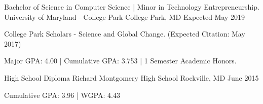

\begin{cventries}

  \cventry
    {Bachelor of Science in Computer Science  |  Minor in Technology Entrepreneurship.} %
    {University of Maryland - College Park} %
    {College Park, MD} %
    {Expected May 2019} %
    {
      \begin{cvitems} %
          \item {College Park Scholars - Science and Global Change. (Expected Citation: May 2017)}
          \item {Major GPA: 4.00 | Cumulative GPA: 3.753 | 1 Semester Academic Honors.}
      \end{cvitems}
    }
    
    \cventry
    {High School Diploma} %
    {Richard Montgomery High School} %
    {Rockville, MD} %
    {June 2015} %
    {
      \begin{cvitems} %
         \item {Cumulative GPA: 3.96 | WGPA: 4.43}
      \end{cvitems}
    }

\end{cventries}
